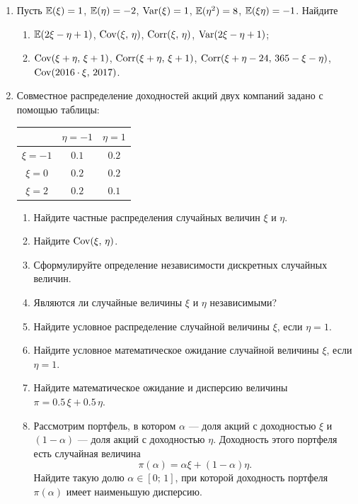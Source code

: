 \begin{enumerate}
\item Пусть $\operatorname{\mathbb{E}}(\xi) = 1$, $\operatorname{\mathbb{E}}(\eta) = -2$, $\operatorname{Var}(\xi) = 1$, $\operatorname{\mathbb{E}}(\eta^2) = 8$, $\operatorname{\mathbb{E}}(\xi \eta) = -1$. Найдите
\begin{enumerate}
\item $\operatorname{\mathbb{E}}(2\xi-\eta+1)$, $\operatorname{Cov}(\xi, \,\eta)$, $\operatorname{Corr}(\xi, \,\eta)$,  $\operatorname{Var}(2\xi-\eta+1)$;
\item $\operatorname{Cov}(\xi+\eta, \,\xi+1)$, $\operatorname{Corr}(\xi+\eta, \,\xi+1)$, $\operatorname{Corr}(\xi+\eta-24, \,365 - \xi - \eta)$, $\operatorname{Cov}(2016\cdot\xi, \, 2017)$.
\end{enumerate}

\item
Совместное распределение доходностей акций двух компаний задано с помощью таблицы:

\begin{center}
\begin{tabular}{ccc}
\toprule
         & $\eta=-1$ & $\eta=1$ \\
\midrule
$\xi=-1$  & $0.1$       & $0.2$   \\
$\xi=0$   & $0.2$       & $0.2$   \\
$\xi=2$   & $0.2$       & $0.1$   \\
\bottomrule
\end{tabular}
\end{center}

\begin{enumerate}
  \item Найдите частные распределения случайных величин $\xi$ и $\eta$.
  \item Найдите $\operatorname{Cov}(\xi,\,\eta)$.
  \item Сформулируйте определение независимости дискретных случайных величин.
  \item Являются ли случайные величины $\xi$ и $\eta$ независимыми?
  \item Найдите условное распределение случайной величины $\xi$, если $\eta = 1$.
  \item Найдите условное математическое ожидание случайной величины $\xi$, если $\eta = 1$.
  \item Найдите математическое ожидание и дисперсию величины $\pi = 0.5\, \xi + 0.5\, \eta$.
  \item Рассмотрим портфель, в котором $\alpha$ — доля акций с доходностью $\xi$ и $(1 - \alpha)$ — доля акций с доходностью $\eta$. Доходность этого портфеля есть случайная величина
  \[\pi(\alpha) = \alpha \xi + (1-\alpha)\eta.\]
  Найдите такую долю $\alpha \in [0;\,1]$, при которой доходность портфеля $\pi(\alpha)$ имеет наименьшую дисперсию.
\end{enumerate}


\end{enumerate}
